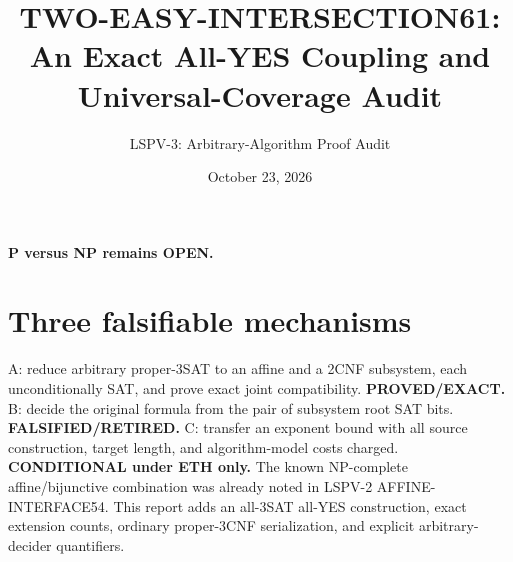 \documentclass[11pt]{article}
\title{TWO-EASY-INTERSECTION61: An Exact All-YES Coupling and Universal-Coverage Audit}
\author{LSPV-3: Arbitrary-Algorithm Proof Audit}
\date{October 23, 2026}
\begin{document}
\maketitle
\begin{center}\textbf{P versus NP remains OPEN.}\end{center}
\section{Three falsifiable mechanisms}
\noindent A: reduce arbitrary proper-3SAT to an affine and a 2CNF subsystem, each unconditionally SAT, and prove exact joint compatibility. \textbf{PROVED/EXACT.}
B: decide the original formula from the pair of subsystem root SAT bits. \textbf{FALSIFIED/RETIRED.}
C: transfer an exponent bound with all source construction, target length, and algorithm-model costs charged. \textbf{CONDITIONAL under ETH only.}
The known NP-complete affine/bijunctive combination was already noted in LSPV-2 AFFINE-INTERFACE54. This report adds an all-3SAT all-YES construction, exact extension counts, ordinary proper-3CNF serialization, and explicit arbitrary-decider quantifiers.
\end{document}

